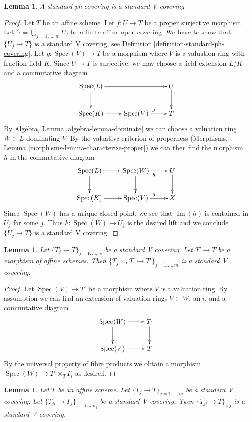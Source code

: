 \documentclass{stacks-project}
\theoremstyle{plain}
\newtheorem{lemma}[subsection]{Lemma}
\theoremstyle{definition}
\theoremstyle{remark}
\numberwithin{equation}{subsection}
\def\Spec{\mathop{\mathrm{Spec}}}
\def\Im{\mathop{\mathrm{Im}}}
\begin{document}
\begin{lemma}
\label{lemma-standard-ph-standard-V}
A standard ph covering is a standard V covering.
\end{lemma}

\begin{proof}
Let $T$ be an affine scheme. Let $f : U \to T$ be a proper surjective
morphism. Let $U = \bigcup_{j = 1, \ldots, m} U_j$ be a finite
affine open covering. We have to show that $\{U_j \to T\}$
is a standard V covering, see
Definition \ref{definition-standard-ph-covering}.
Let $g : \Spec(V) \to T$
be a morphism where $V$ is a valuation ring with fraction field $K$.
Since $U \to T$ is surjective, we may choose a field extension
$L/K$ and a commutative diagram
$$
\xymatrix{
\Spec(L) \ar[rr] \ar[d] & & U \ar[d] \\
\Spec(K) \ar[r] & \Spec(V) \ar[r]^g & T
}
$$
By Algebra, Lemma \ref{algebra-lemma-dominate} we can choose a valuation ring
$W \subset L$ dominating $V$. By the valuative criterion of
properness (Morphisms, Lemma \ref{morphisms-lemma-characterize-proper})
we can then find the morphism $h$ in the commutative
diagram
$$
\xymatrix{
\Spec(L) \ar[r] \ar[d] & \Spec(W) \ar[r]_h \ar[d] & U \ar[d] \\
\Spec(K) \ar[r] & \Spec(V) \ar[r]^g & X
}
$$
Since $\Spec(W)$ has a unique closed point, we see that $\Im(h)$
is contained in $U_j$ for some $j$. Thus $h : \Spec(W) \to U_j$
is the desired lift and we conclude $\{U_j \to T\}$ is a standard V covering.
\end{proof}

\begin{lemma}
\label{lemma-base-change-standard-V}
Let $\{T_j \to T\}_{j = 1, \ldots, m}$ be a standard V covering.
Let $T' \to T$ be a morphism of affine schemes.
Then $\{T_j \times_T T' \to T'\}_{j = 1, \ldots, m}$ is a
standard V covering.
\end{lemma}

\begin{proof}
Let $\Spec(V) \to T'$ be a morphism where $V$ is a valuation ring.
By assumption we can find an extension of valuation rings $V \subset W$,
an $i$, and a commutative diagram
$$
\xymatrix{
\Spec(W) \ar[r] \ar[d] & T_i \ar[d] \\
\Spec(V) \ar[r] & T
}
$$
By the universal property of fibre products
we obtain a morphism $\Spec(W) \to T' \times_T T_i$
as desired.
\end{proof}

\begin{lemma}
\label{lemma-composition-standard-V}
Let $T$ be an affine scheme. Let $\{T_j \to T\}_{j = 1, \ldots, m}$
be a standard V covering. Let $\{T_{ji} \to T_j\}_{i = 1, \ldots n_j}$
be a standard V covering. Then $\{T_{ji} \to T\}_{i, j}$
is a standard V covering.
\end{lemma}
\end{document}
